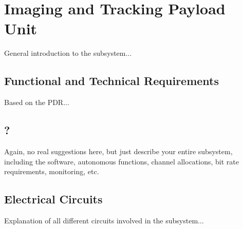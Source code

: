 \chapter{Imaging and Tracking Payload Unit}
\label{chap:itpu}

General introduction to the subsystem...

\section{Functional and Technical Requirements}

Based on the PDR...

\section{?}

Again, no real suggestions here, but just describe your entire subsystem, including the software, autonomous functions, channel allocations, bit rate requirements, monitoring, etc.

\section{Electrical Circuits}

Explanation of all different circuits involved in the subsystem...